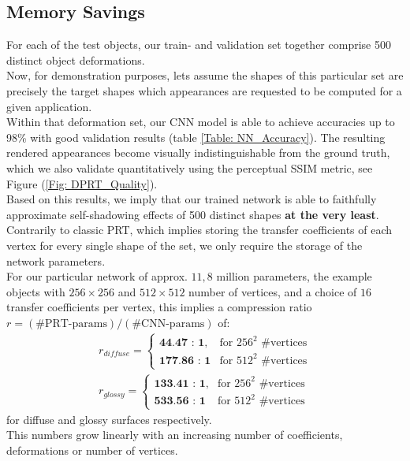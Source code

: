 \subsection*{Memory Savings}
For each of the test objects, our train- and validation set together comprise 500 distinct object deformations. \\
Now, for demonstration purposes, lets assume the shapes of this particular set are precisely the target shapes which appearances are requested to be computed for a given application.
\\
Within that deformation set, our CNN model is able to achieve accuracies up to 98\% with good validation results (table \ref{Table: NN_Accuracy}). The resulting rendered appearances become visually indistinguishable from the ground truth, which we also validate quantitatively using the perceptual SSIM metric, see Figure (\ref{Fig: DPRT_Quality}). 
\\
Based on this results, we imply that our trained network is able to faithfully approximate self-shadowing effects of 500 distinct shapes \textbf{at the very least}. Contrarily to classic PRT, which implies storing the transfer coefficients of each vertex for every single shape of the set, we only require the storage of the network parameters.
\\ 
For our particular network of approx. $11,8$ million parameters,  the example objects with $256 \times 256$ and $512 \times 512$ number of vertices, and  a choice of $16$ transfer coefficients per vertex, this implies a compression ratio $r = (\text{\# PRT-params})/(\text{\# CNN-params})$ of: 
\begin{align*}
r_{diffuse} = 
\begin{cases}
\textbf{44.47 : 1} , & \mbox{for } 256^2 \mbox{ \#vertices} \\
\textbf{177.86 : 1} & \mbox{for } 512^2 \mbox{ \#vertices}
\end{cases}
\\
r_{glossy} = 
\begin{cases}
\textbf{133.41 : 1} , & \mbox{for } 256^2 \mbox{ \#vertices} \\
\textbf{533.56 : 1} & \mbox{for } 512^2 \mbox{ \#vertices}
\end{cases}
\end{align*}
for diffuse and glossy surfaces respectively.\\
This numbers grow linearly with an increasing number of coefficients, deformations or number of vertices. 
